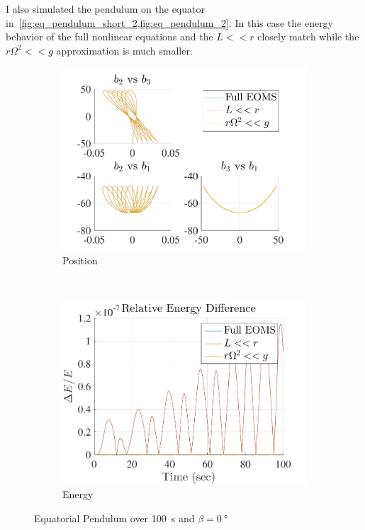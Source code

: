 \documentclass[11pt, reqno]{article}   	%
\begin{document}
I also simulated the pendulum on the equator in~\cref{fig:eq_pendulum_short_2,fig:eq_pendulum_2}.
In this case the energy behavior of the full nonlinear equations and the \( L << r\) closely match while the \( r \Omega^2 << g\) approximation is much smaller.
\begin{figure}[htbp] 
    \centering 
    \begin{subfigure}[htbp]{0.5\textwidth} 
        \includegraphics[width=\textwidth]{figures/eq_position_short_2.pdf} 
        \caption{Position } \label{fig:eq_pos_short_2} 
    \end{subfigure}~ %
    \begin{subfigure}[htbp]{0.5\textwidth} 
        \includegraphics[width=\textwidth]{figures/eq_energy_short_2.pdf} 
        \caption{Energy } \label{fig:eq_energy_short_2} 
    \end{subfigure}
    \caption{Equatorial Pendulum over \SI{100}{s} and \( \beta = \SI{0}{\degree} \)}
    \label{fig:eq_pendulum_short_2} 
\end{figure}{}
\end{document}
